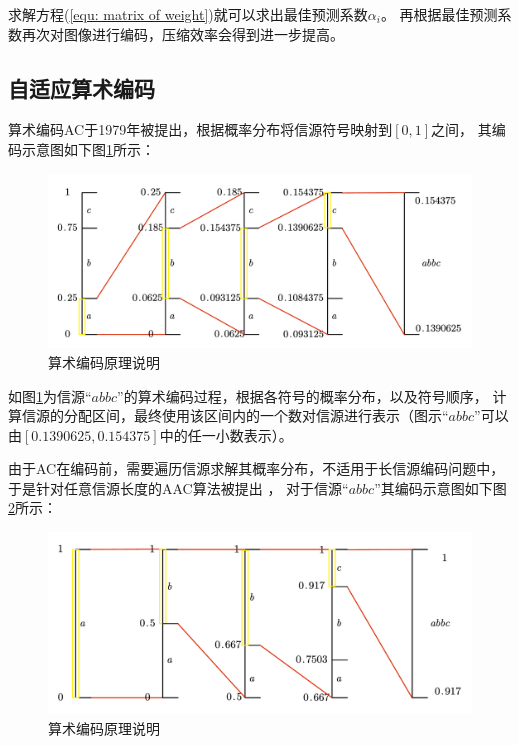 \documentclass[12pt,a4paper]{article}%
\begin{document}
求解方程(\ref{equ: matrix of weight})就可以求出最佳预测系数$\alpha_i$。
再根据最佳预测系数再次对图像进行编码，压缩效率会得到进一步提高。


\subsection{自适应算术编码}
算术编码AC于1979年被提出\cite[]{Rissanen1979ArithmeticCoding}，根据概率分布将信源符号映射到$[0,1]$之间，
其编码示意图如下图\ref{fig: arithmetic coding}所示：
\begin{figure}[thb] \centering
    \includegraphics[scale=0.35,trim=0 10 0 10,clip]{imgs/Arithmetic coding.pdf}
    \caption{算术编码原理说明}
    \label{fig: arithmetic coding}
\end{figure}

如图\ref{fig: arithmetic coding}为信源$“abbc”$的算术编码过程，根据各符号的概率分布，以及符号顺序，
计算信源的分配区间，最终使用该区间内的一个数对信源进行表示（图示$“abbc”$可以由$[0.1390625,0.154375]$中的任一小数表示）。

由于AC在编码前，需要遍历信源求解其概率分布，不适用于长信源编码问题中，于是针对任意信源长度的AAC算法被提出
\cite[]{Moffat1990LinearTimeAdaptive}，
对于信源$“abbc”$其编码示意图如下图\ref{fig: adaptive arithmetic coding}所示：
\begin{figure}[thb] \centering
    \includegraphics[scale=0.35,trim=0 15 0 30,clip]{imgs/Adaptive arithmetic coding.pdf}
    \caption{算术编码原理说明}
    \label{fig: adaptive arithmetic coding}
\end{figure}
\end{document}
